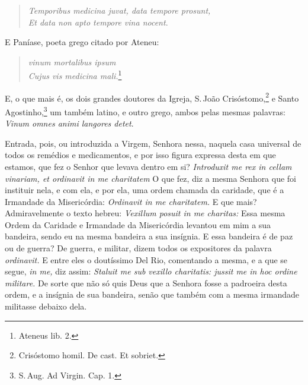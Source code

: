 \begin{verse}
\emph{Temporibus medicina juvat, data tempore prosunt,}\\
\emph{Et data non apto tempore vina nocent}.
\end{verse}

E Paníase, poeta grego citado por Ateneu:

\begin{verse}
\emph{vinum mortalibus ipsum}\\
\emph{Cujus vis medicina mali.}\footnote{Ateneus lib. 2.}
\end{verse}

E, o que mais é, os dois grandes doutores da Igreja, S.\,João Crisóstomo,\footnote{Crisóstomo homil. De cast. Et sobriet.}
e Santo Agostinho,\footnote{S.\,Aug. Ad Virgin. Cap. 1.} um também latino, e outro grego, ambos pelas mesmas
palavras: \emph{Vinum omnes animi langores detet}.

Entrada, pois, ou introduzida a Virgem, Senhora nessa, naquela casa
universal de todos os remédios e medicamentos, e por isso figura
expressa desta em que estamos, que fez o Senhor que levava dentro em si?
\emph{Introduxit me rex in cellam vinariam, et ordinavit in me
charitatem} O que fez, diz a mesma Senhora que foi instituir nela, e com
ela, e por ela, uma ordem chamada da caridade, que é a
Irmandade da Misericórdia: \emph{Ordinavit in me charitatem.} E que
mais? Admiravelmente o texto hebreu: \emph{Vexillum posuit in me
charitas:} Essa mesma Ordem da Caridade e Irmandade da Misericórdia
levantou em mim a sua bandeira, sendo eu na mesma bandeira a sua
insígnia. E essa bandeira é de paz ou de guerra? De guerra, e militar,
dizem todos os expositores da palavra \emph{ordinavit.} E entre eles o
doutíssimo Del Rio, comentando a mesma, e a que se segue, \emph{in me,}
diz assim: \emph{Staluit me sub vexillo charitatis: jussit me in hoc
ordine militare.} De sorte que não só quis Deus que a Senhora fosse a
padroeira desta ordem, e a insígnia de sua bandeira, senão que também
com a mesma irmandade militasse debaixo dela.

